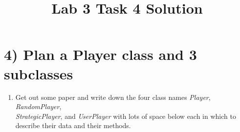 \documentclass[12pt]{article}
\begin{document}
\title{Lab 3 Task 4 Solution}
\date{}
\maketitle


\section*{4) Plan a Player class and 3 subclasses}
\begin{enumerate}[1.]
    \item Get out some paper and write down the four class names \textit{Player},
    \textit{RandomPlayer},\\ \textit{StrategicPlayer}, and \textit{UserPlayer} with lots
    of space below each in which to describe their data and their methods.

    \bigskip


\end{enumerate}
\end{document}
